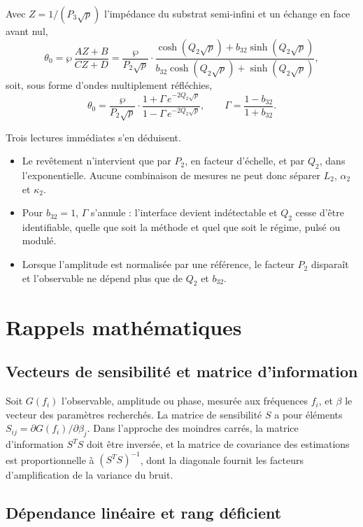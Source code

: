 \documentclass[11pt,a4paper]{article}
\begin{document}
Avec $Z=1/(P_{3}\sqrt{p})$ l'impédance du substrat semi-infini et un échange en face avant nul,
\[ \theta_{0} = \wp\,\frac{AZ+B}{CZ+D}
= \frac{\wp}{P_{2}\sqrt{p}}\cdot
\frac{\cosh\!\left(Q_{2}\sqrt{p}\right)+b_{32}\sinh\!\left(Q_{2}\sqrt{p}\right)}
{b_{32}\cosh\!\left(Q_{2}\sqrt{p}\right)+\sinh\!\left(Q_{2}\sqrt{p}\right)} , \]
soit, sous forme d'ondes multiplement réfléchies,
\[ \theta_{0} = \frac{\wp}{P_{2}\sqrt{p}}\cdot
\frac{1+\Gamma\,e^{-2Q_{2}\sqrt{p}}}{1-\Gamma\,e^{-2Q_{2}\sqrt{p}}} ,
\qquad \Gamma = \frac{1-b_{32}}{1+b_{32}} . \]

Trois lectures immédiates s'en déduisent.

\begin{itemize}
\item Le revêtement n'intervient que par $P_{2}$, en facteur d'échelle, et par $Q_{2}$, dans
l'exponentielle. Aucune combinaison de mesures ne peut donc séparer $L_{2}$, $\alpha_{2}$ et
$\kappa_{2}$.
\item Pour $b_{32}=1$, $\Gamma$ s'annule : l'interface devient indétectable et $Q_{2}$ cesse d'être
identifiable, quelle que soit la méthode et quel que soit le régime, pulsé ou modulé.
\item Lorsque l'amplitude est normalisée par une référence, le facteur $P_{2}$ disparaît et l'observable
ne dépend plus que de $Q_{2}$ et $b_{32}$.
\end{itemize}

\section{Rappels mathématiques}

\subsection{Vecteurs de sensibilité et matrice d'information}

Soit $G(f_{i})$ l'observable, amplitude ou phase, mesurée aux fréquences $f_{i}$, et $\beta$ le vecteur
des paramètres recherchés. La matrice de sensibilité $S$ a pour éléments $S_{ij}=\partial G(f_{i})/
\partial\beta_{j}$. Dans l'approche des moindres carrés, la matrice d'information $S^{T}S$ doit être
inversée, et la matrice de covariance des estimations est proportionnelle à $\left(S^{T}S\right)^{-1}$,
dont la diagonale fournit les facteurs d'amplification de la variance du bruit.

\subsection{Dépendance linéaire et rang déficient}
\end{document}

